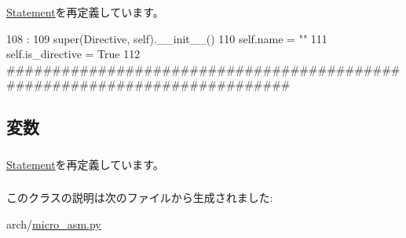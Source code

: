\hyperlink{classmicro__asm_1_1Statement_ac775ee34451fdfa742b318538164070e}{Statement}を再定義しています。


\begin{DoxyCode}
108                       :
109         super(Directive, self).__init__()
110         self.name = ""
111         self.is_directive = True
112 
##########################################################################
\end{DoxyCode}


\subsection{変数}
\hypertarget{classmicro__asm_1_1Directive_a7715b944fddfe15aad875fe3c226d81b}{
\subsubsection[{is\_\-directive}]{}}
\label{classmicro__asm_1_1Directive_a7715b944fddfe15aad875fe3c226d81b}


\hyperlink{classmicro__asm_1_1Statement_a7715b944fddfe15aad875fe3c226d81b}{Statement}を再定義しています。\hypertarget{classmicro__asm_1_1Directive_ab74e6bf80237ddc4109968cedc58c151}{
\subsubsection[{name}]{}}
\label{classmicro__asm_1_1Directive_ab74e6bf80237ddc4109968cedc58c151}


このクラスの説明は次のファイルから生成されました:\begin{DoxyCompactItemize}
\item 
arch/\hyperlink{micro__asm_8py}{micro\_\-asm.py}\end{DoxyCompactItemize}
